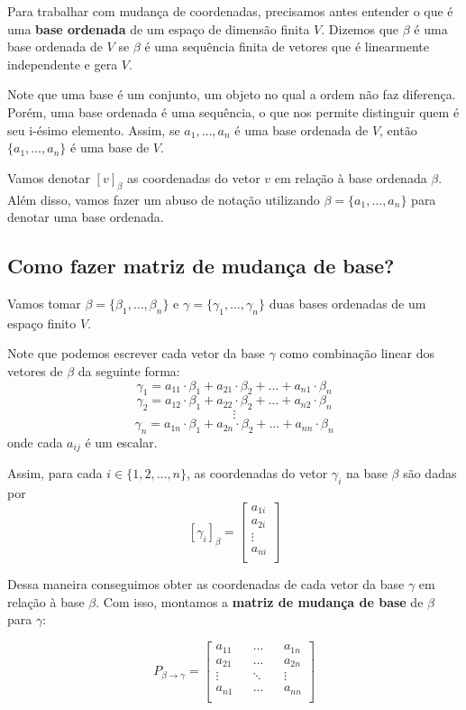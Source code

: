 \documentclass[12pt,a4paper]{article}
\begin{document}
Para trabalhar com mudança de coordenadas, precisamos antes entender o que é uma \textbf{base ordenada} de um espaço de dimensão finita $V$. Dizemos que $\beta$ é uma base ordenada de $V$ se $\beta$ é uma sequência finita de vetores que é linearmente independente e gera $V$.

Note que uma base é um conjunto, um objeto no qual a ordem não faz diferença. Porém, uma base ordenada é uma sequência, o que nos permite distinguir quem é seu i-ésimo elemento. Assim, se $a_1, \ldots, a_n$ é uma base ordenada de $V$, então $\{ a_1, \ldots, a_n \}$ é uma base de $V$.

Vamos denotar $[ v ]_\beta$ as coordenadas do vetor $v$ em relação à base ordenada $\beta$. Além disso, vamos fazer um abuso de notação utilizando $\beta = \{ a_1, \ldots, a_n \}$ para denotar uma base ordenada.

\newpage

\subsection{Como fazer matriz de mudança de base?}

Vamos tomar $\beta = \{ \beta_1, \ldots, \beta_n \}$ e $\gamma = \{ \gamma_1, \ldots, \gamma_n \}$ duas bases ordenadas de um espaço finito $V$.

Note que podemos escrever cada vetor da base $\gamma$ como combinação linear dos vetores de $\beta$ da seguinte forma:
$$\gamma_1 = a_{11}\cdot \beta_1 + a_{21}\cdot \beta_2 + \ldots + a_{n1}\cdot \beta_n$$
$$\gamma_2 = a_{12}\cdot \beta_1 + a_{22}\cdot \beta_2 + \ldots + a_{n2}\cdot \beta_n$$
$$\vdots$$
$$\gamma_n = a_{1n}\cdot \beta_1 + a_{2n}\cdot \beta_2 + \ldots + a_{nn}\cdot \beta_n$$
onde cada $a_{ij}$ é um escalar.

Assim, para cada $i \in \{1, 2, \ldots, n \}$, as coordenadas do vetor $\gamma_i$ na base $\beta$ são dadas por
$$
[\gamma_i]_\beta =
\begin{bmatrix} 
a_{1i} \\
a_{2i} \\
\vdots \\
a_{ni} \\
\end{bmatrix}
$$

Dessa maneira conseguimos obter as coordenadas de cada vetor da base $\gamma$ em relação à base $\beta$. Com isso, montamos a \textbf{matriz de mudança de base} de $\beta$ para $\gamma$:

$$
P_{\beta \to \gamma} =
\begin{bmatrix} 
a_{11} && \ldots && a_{1n} \\
a_{21} && \ldots && a_{2n} \\
\vdots && \ddots && \vdots \\
a_{n1} && \ldots && a_{nn} \\
\end{bmatrix}
$$
\end{document}
